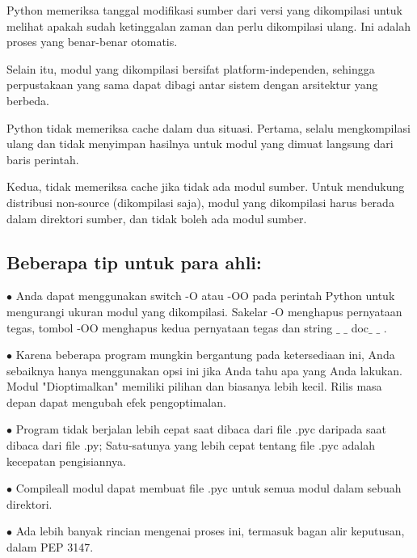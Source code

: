 \vspace{\baselineskip}
\noindent Python memeriksa tanggal modifikasi sumber dari versi yang dikompilasi untuk melihat apakah sudah ketinggalan zaman dan perlu dikompilasi ulang. Ini adalah proses yang benar-benar otomatis.\par  
\vspace{\baselineskip}
\noindent Selain itu, modul yang dikompilasi bersifat platform-independen, sehingga perpustakaan yang sama dapat dibagi antar sistem dengan arsitektur yang berbeda.\par  
\vspace{\baselineskip}
\noindent Python tidak memeriksa cache dalam dua situasi. Pertama, selalu mengkompilasi ulang dan tidak menyimpan hasilnya untuk modul yang dimuat langsung dari baris perintah.\par
\vspace{\baselineskip}  
\noindent Kedua, tidak memeriksa cache jika tidak ada modul sumber. Untuk mendukung distribusi non-source (dikompilasi saja), modul yang dikompilasi harus berada dalam direktori sumber, dan tidak boleh ada modul sumber.\par


\vspace{\baselineskip}
\subsection {Beberapa tip untuk para ahli:}
\vspace{\baselineskip}
\noindent $\bullet$  Anda dapat menggunakan switch -O atau -OO pada perintah Python untuk mengurangi ukuran modul yang dikompilasi. Sakelar -O menghapus pernyataan tegas, tombol -OO menghapus kedua pernyataan tegas dan string $ \_ $ $ \_ $ doc$ \_ $ $ \_ $ .\par
\vspace{\baselineskip} 
\noindent $\bullet$  Karena beberapa program mungkin bergantung pada ketersediaan ini, Anda sebaiknya hanya menggunakan opsi ini jika Anda tahu apa yang Anda lakukan. Modul "Dioptimalkan" memiliki pilihan dan biasanya lebih kecil. Rilis masa depan dapat mengubah efek pengoptimalan.\par

\vspace{\baselineskip}
\noindent $\bullet$  Program tidak berjalan lebih cepat saat dibaca dari file .pyc daripada saat dibaca dari file .py; Satu-satunya yang lebih cepat tentang file .pyc adalah kecepatan pengisiannya.\par

\vspace{\baselineskip}
\noindent $\bullet$  Compileall modul dapat membuat file .pyc untuk semua modul dalam sebuah direktori.\par

\vspace{\baselineskip}
\noindent $\bullet$  Ada lebih banyak rincian mengenai proses ini, termasuk bagan alir keputusan, dalam PEP 3147.\par

